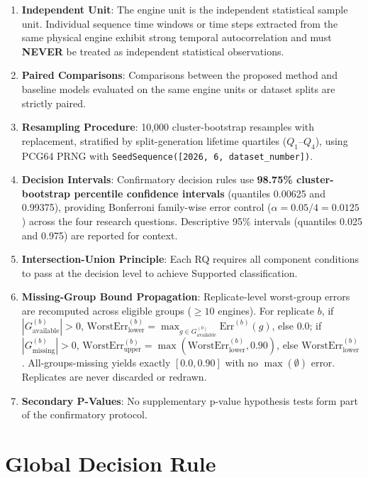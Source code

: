 \documentclass{article}
\begin{document}
\begin{enumerate}[leftmargin=*]
  \item \textbf{Independent Unit}: The engine unit is the independent statistical sample unit. Individual sequence time windows or time steps extracted from the same physical engine exhibit strong temporal autocorrelation and must \textbf{NEVER} be treated as independent statistical observations.
  \item \textbf{Paired Comparisons}: Comparisons between the proposed method and baseline models evaluated on the same engine units or dataset splits are strictly paired.
  \item \textbf{Resampling Procedure}: 10,000 cluster-bootstrap resamples with replacement, stratified by split-generation lifetime quartiles ($Q_1$--$Q_4$), using PCG64 PRNG with \texttt{SeedSequence([2026, 6, dataset\_number])}.
  \item \textbf{Decision Intervals}: Confirmatory decision rules use \textbf{98.75\% cluster-bootstrap percentile confidence intervals} (quantiles 0.00625 and 0.99375), providing Bonferroni family-wise error control ($\alpha = 0.05 / 4 = 0.0125$) across the four research questions. Descriptive 95\% intervals (quantiles 0.025 and 0.975) are reported for context.
  \item \textbf{Intersection-Union Principle}: Each RQ requires all component conditions to pass at the decision level to achieve Supported classification.
  \item \textbf{Missing-Group Bound Propagation}: Replicate-level worst-group errors are recomputed across eligible groups ($\ge 10$ engines). For replicate $b$, if $|G_{\text{available}}^{(b)}| > 0$, $\text{WorstErr}_{\text{lower}}^{(b)} = \max_{g \in G_{\text{available}}^{(b)}} \text{Err}^{(b)}(g)$, else $0.0$; if $|G_{\text{missing}}^{(b)}| > 0$, $\text{WorstErr}_{\text{upper}}^{(b)} = \max(\text{WorstErr}_{\text{lower}}^{(b)}, 0.90)$, else $\text{WorstErr}_{\text{lower}}^{(b)}$. All-groups-missing yields exactly $[0.0, 0.90]$ with no $\max(\emptyset)$ error. Replicates are never discarded or redrawn.
  \item \textbf{Secondary P-Values}: No supplementary p-value hypothesis tests form part of the confirmatory protocol.
\end{enumerate}

\section*{Global Decision Rule}
\end{document}
